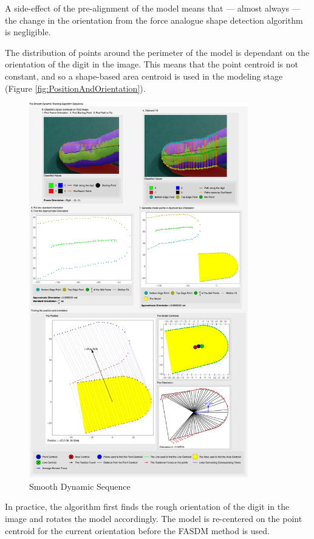 A side-effect of the pre-alignment of the model means that --- almost always --- the change in the orientation from the force analogue shape detection algorithm is negligible.

The distribution of points around the perimeter of the model is dependant on the orientation of the digit in the image. This means that the point centroid is not constant, and so a shape-based area centroid is used in the modeling stage (Figure \ref{fig:PositionAndOrientation}). 

\begin{figure}[h!]
  \centering
    \includegraphics[width=0.85\textwidth]{Chapter4/Figs/Smooth_Dynamic_Sequence.jpg}
    \caption{Smooth Dynamic Sequence}\label{fig:SmoothDynamicSequence}
\end{figure}


In practice, the algorithm first finds the rough orientation of the digit in the image and rotates the model accordingly. The model is re-centered on the point centroid for the current orientation before the FASDM method is used. 

